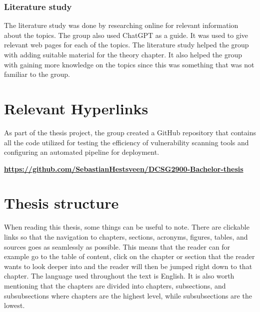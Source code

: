 \subsubsection{Literature study}
The literature study was done by researching online for relevant information about the topics. The group also used ChatGPT as a guide. It was used to give relevant web pages for each of the topics. The literature study helped the group with adding suitable material for the theory chapter. It also helped the group with gaining more knowledge on the topics since this was something that was not familiar to the group. 
\newpage
\section{Relevant Hyperlinks}
As part of the thesis project, the group created a GitHub repository that contains all the code utilized for testing the efficiency of vulnerability scanning tools and configuring an automated pipeline for deployment. 

\href{https://github.com/SebastianHestsveen/DCSG2900-Bachelor-thesis}{\textbf{https://github.com/SebastianHestsveen/DCSG2900-Bachelor-thesis}}

\section{Thesis structure}
When reading this thesis, some things can be useful to note. There are clickable links so that the navigation to chapters, sections, acronyms, figures, tables, and sources goes as seamlessly as possible. This means that the reader can for example go to the table of content, click on the chapter or section that the reader wants to look deeper into and the reader will then be jumped right down to that chapter. The language used throughout the text is English. It is also worth mentioning that the chapters are divided into chapters, subsections, and subsubsections where chapters are the highest level, while subsubsections are the lowest. 
